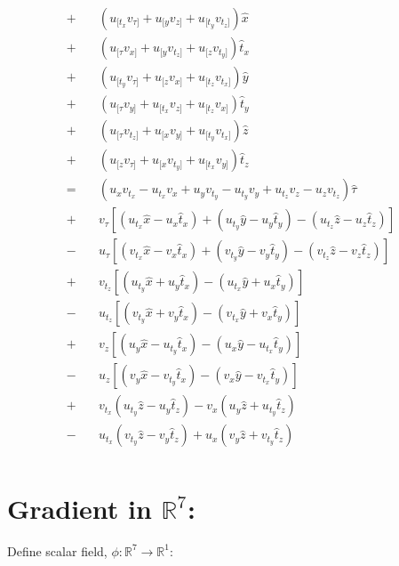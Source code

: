 \documentclass{article}
\begin{document}
\begin{align*}
+& \quad (u_{[t_x} v_{\tau]} + u_{[y} v_{z]} + u_{[t_y} v_{t_z]}) \hat x \\
+& \quad (u_{[\tau} v_{x]} + u_{[y} v_{t_z]} + u_{[z} v_{t_y]}) \hat t_x \\
+& \quad (u_{[t_y} v_{\tau]} + u_{[z} v_{x]} + u_{[t_z} v_{t_x]}) \hat y \\ \tag{FORM 2}
+& \quad (u_{[\tau} v_{y]} + u_{[t_x} v_{z]} + u_{[t_z} v_{x]}) \hat t_y \\
+& \quad (u_{[\tau} v_{t_z]} + u_{[x} v_{y]} + u_{[t_y} v_{t_x]}) \hat z \\
+& \quad (u_{[z} v_{\tau]} + u_{[x} v_{t_y]} + u_{[t_x} v_{y]}) \hat t_z \\
=& \quad (u_x v_{t_x} - u_{t_x} v_x  + u_y v_{t_y} - u_{t_y} v_y + u_{t_z} v_z  - u_z v_{t_z}) \hat \tau \\
+& \quad v_\tau[(u_{t_x}\hat x - u_x \hat t_x) + (u_{t_y}\hat y - u_y \hat t_y) - (u_{t_z}\hat z - u_z \hat t_z)]\\
-& \quad u_\tau[(v_{t_x}\hat x - v_x \hat t_x) + (v_{t_y}\hat y - v_y \hat t_y) - (v_{t_z}\hat z - v_z \hat t_z)]\\
+& \quad v_{t_z}[(u_{t_y}\hat x + u_y \hat t_x) - (u_{t_x}\hat y + u_x \hat t_y)]\\
-& \quad u_{t_z}[(v_{t_y}\hat x + v_y \hat t_x) - (v_{t_x}\hat y + v_x \hat t_y)]\\
+& \quad v_z[(u_y\hat x - u_{t_y} \hat t_x) - (u_x\hat y - u_{t_x} \hat t_y)]\\
-& \quad u_z[(v_y\hat x - v_{t_y} \hat t_x) - (v_x\hat y - v_{t_x} \hat t_y)]\\  \tag{FORM 3}
+& \quad v_{t_x}(u_{t_y}\hat z - u_y \hat t_z) - v_x(u_y\hat z + u_{t_y} \hat t_z)\\
-& \quad u_{t_x}(v_{t_y}\hat z - v_y \hat t_z) + u_x(v_y\hat z + v_{t_y} \hat t_z)\\
\end{align*}

\section*{Gradient in $\mathbb{R}^7$:}

\noindent Define scalar field, $\phi: \mathbb{R}^7 \to \mathbb{R}^1$:\\
\end{document}
